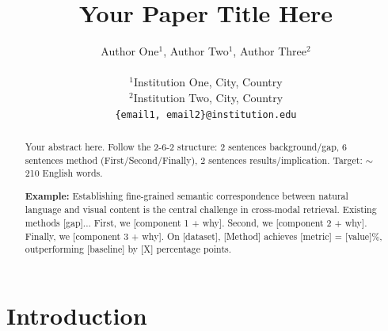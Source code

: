 \documentclass[10pt,twocolumn,letterpaper]{article}
\begin{document}
\title{Your Paper Title Here}

\author{
  Author One${}^1$,
  Author Two${}^1$,
  Author Three${}^2$ \\
  \\
  ${}^1$Institution One, City, Country \\
  ${}^2$Institution Two, City, Country \\
  \texttt{\{email1, email2\}@institution.edu}
}

\maketitle

\begin{abstract}
  Your abstract here. Follow the 2-6-2 structure:
  2 sentences background/gap,
  6 sentences method (First/Second/Finally),
  2 sentences results/implication.
  Target: $\sim$210 English words.

  \textbf{Example:} Establishing fine-grained semantic correspondence between
  natural language and visual content is the central challenge in cross-modal
  retrieval. Existing methods [gap]... First, we [component 1 + why].
  Second, we [component 2 + why]. Finally, we [component 3 + why].
  On [dataset], [Method] achieves [metric] = [value]\%, outperforming
  [baseline] by [X] percentage points.
\end{abstract}

\section{Introduction}
\label{sec:intro}

\end{document}
